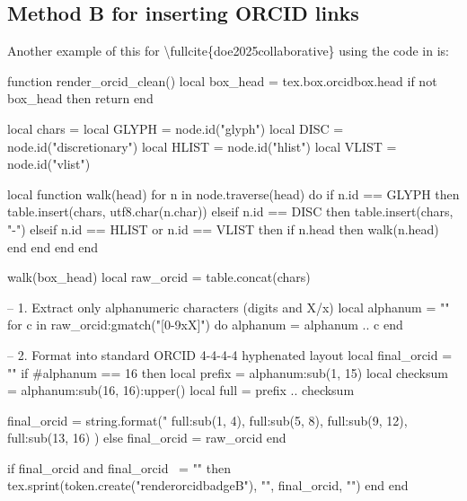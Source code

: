 \documentclass[12pt, twoside]{article}
\begin{document}
\subsection{Method B for inserting ORCID links}
\label{sec:orcidlinksMethodB}
Another example of this for \textbackslash fullcite\{doe2025collaborative\} using the code in  is:
\newbox\orcidbox

\newcommand*{\renderorcidbadgeB}[1]{%
\orcidlink{#1}%
}

\begin{luacode*}
function render_orcid_clean()
  local box_head = tex.box.orcidbox.head
  if not box_head then return end

  local chars = {}
  local GLYPH = node.id("glyph")
  local DISC  = node.id("discretionary")
  local HLIST = node.id("hlist")
  local VLIST = node.id("vlist")

  local function walk(head)
    for n in node.traverse(head) do
      if n.id == GLYPH then
        table.insert(chars, utf8.char(n.char))
      elseif n.id == DISC then
        table.insert(chars, "-")
      elseif n.id == HLIST or n.id == VLIST then
        if n.head then walk(n.head) end
      end
    end
  end

  walk(box_head)
  local raw_orcid = table.concat(chars)

  -- 1. Extract only alphanumeric characters (digits and X/x)
  local alphanum = ""
  for c in raw_orcid:gmatch("[0-9xX]") do
    alphanum = alphanum .. c
  end

  -- 2. Format into standard ORCID 4-4-4-4 hyphenated layout
  local final_orcid = ""
  if #alphanum == 16 then
    local prefix = alphanum:sub(1, 15)
    local checksum = alphanum:sub(16, 16):upper()
    local full = prefix .. checksum

    final_orcid = string.format("%
      full:sub(1, 4),
      full:sub(5, 8),
      full:sub(9, 12),
      full:sub(13, 16)
    )
  else
    final_orcid = raw_orcid
  end

  if final_orcid and final_orcid ~= "" then
    tex.sprint(token.create("renderorcidbadgeB"), "{", final_orcid, "}")
  end
end
\end{luacode*}

\begingroup
\renewcommand*{\mkbibnamefamily}[1]{%
  #1%
  \edef\curridx{\the\value{listcount}}%
  \haspartannotation[author][default][\curridx]{equal}{%
    \textsuperscript{*}%
  }{}%
  \haspartannotation[author][default][\curridx]{orcid}{%
    \global\setbox\orcidbox=\hbox{\getpartannotation[author][default][\curridx]{orcid}}%
    \directlua{render_orcid_clean()}%
  }{}%
}
\end{document}
